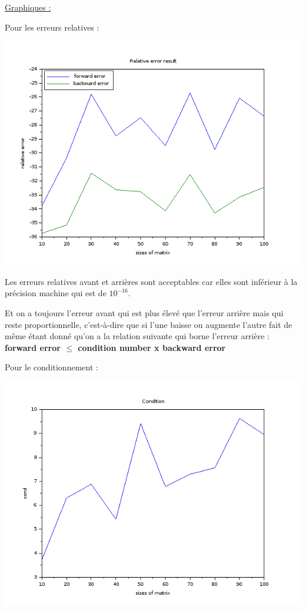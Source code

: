 \documentclass[12pt, letterpaper]{article}
\begin{document}
\underline{Graphiques :} \newline

Pour les erreurs relatives :

\includegraphics[scale=0.5]{img/gauss_error.png}

Les erreurs relatives avant et arrières sont acceptables car elles
sont inférieur à la précision machine qui est de $10^{-16}$. \newline

Et on a toujours l'erreur avant qui est plus élevé que l'erreur
arrière mais qui reste proportionnelle, c'est-à-dire que si l'une
baisse ou augmente l'autre fait de même étant donné qu'on a la
relation suivante qui borne l'erreur arrière : \newline
\textbf{forward error $\le$ condition number x backward
  error} \newline

Pour le conditionnement :

\includegraphics[scale=0.5]{img/gauss_cond.png}
\end{document}
